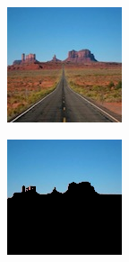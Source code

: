 \begin{figure}
    \centering
    \begin{subfigure}{0.31\textwidth}
        \includegraphics[width=\textwidth]{RegMon.png}
    \end{subfigure}
   \hspace*{\fill}
    \begin{subfigure}{0.31\textwidth}
        \includegraphics[width=\textwidth]{NegMon.png}

\end{subfigure}
\end{figure}
